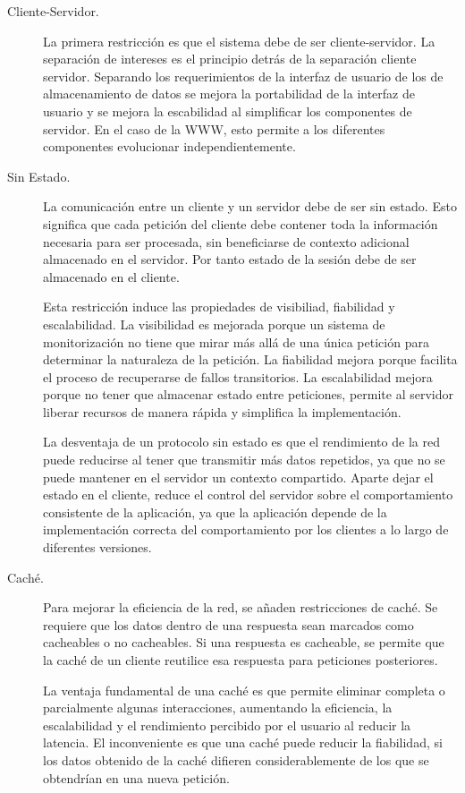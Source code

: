 \begin{description}

\item[Cliente-Servidor.] La primera restricción es que el sistema debe
  de ser cliente-servidor. La separación de intereses es el principio
  detrás de la separación cliente servidor. Separando los
  requerimientos de la interfaz de usuario de los de almacenamiento de
  datos se mejora la portabilidad de la interfaz de usuario y se
  mejora la escabilidad al simplificar los componentes de servidor. En
  el caso de la WWW, esto permite a los diferentes componentes
  evolucionar independientemente.

\item[Sin Estado.] La comunicación entre un cliente y un servidor debe
  de ser sin estado. Esto significa que cada petición del cliente debe
  contener toda la información necesaria para ser procesada, sin
  beneficiarse de contexto adicional almacenado en el servidor. Por
  tanto estado de la sesión debe de ser almacenado en el cliente.

  Esta restricción induce las propiedades de visibiliad, fiabilidad y
  escalabilidad. La visibilidad es mejorada porque un sistema de
  monitorización no tiene que mirar más allá de una única petición
  para determinar la naturaleza de la petición. La fiabilidad mejora
  porque facilita el proceso de recuperarse de fallos transitorios. La
  escalabilidad mejora porque no tener que almacenar estado entre
  peticiones, permite al servidor liberar recursos de manera rápida y
  simplifica la implementación.

  La desventaja de un protocolo sin estado es que el rendimiento de la
  red puede reducirse al tener que transmitir más datos repetidos, ya
  que no se puede mantener en el servidor un contexto
  compartido. Aparte dejar el estado en el cliente, reduce el control
  del servidor sobre el comportamiento consistente de la aplicación,
  ya que la aplicación depende de la implementación correcta del
  comportamiento por los clientes a lo largo de diferentes versiones.

\item[Caché.] Para mejorar la eficiencia de la red, se añaden
  restricciones de caché. Se requiere que los datos dentro de una
  respuesta sean marcados como cacheables o no cacheables. Si una
  respuesta es cacheable, se permite que la caché de un cliente
  reutilice esa respuesta para peticiones posteriores.

  La ventaja fundamental de una caché es que permite eliminar completa
  o parcialmente algunas interacciones, aumentando la eficiencia, la
  escalabilidad y el rendimiento percibido por el usuario al reducir
  la latencia. El inconveniente es que una caché puede reducir la
  fiabilidad, si los datos obtenido de la caché difieren
  considerablemente de los que se obtendrían en una nueva petición.


\end{description}

